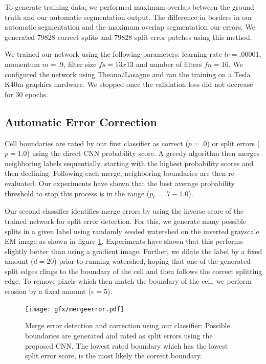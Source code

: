 To generate training data, we performed maximum overlap between the ground truth and our automatic segmentation output. The difference in borders in our automatic segmentation and the maximum overlap segmentation  our errors. We generated 79828 correct splits and 79828 split error patches using this method.

We trained our network using the following parameters: learning rate $lr=.00001$, momentum $m=.9$, filter size $fs=13x13$ and number of filters $fn=16$. We configured the network using Theano/Lasagne and ran the training on a Tesla K40m graphics hardware. We stopped once the validation loss did not decrease for 30 epochs.

\subsection{Automatic Error Correction}
Cell boundaries are rated by our first classifier as correct ($p=.0$) or split errors ($p=1.0$) using the direct CNN probability score. A greedy algorithm then merges neighboring labels sequentially, starting with the highest probability scores and then declining. Following each merge, neighboring boundaries are then re-evaluated. Our experiments have shown that the best average probability threshold to stop this process is in the range ($p_t=.7-1.0$).

Our second classifier identifies merge errors by using the inverse score of the trained network for split error detection. For this, we generate many possible splits in a given label using randomly seeded watershed on the inverted grayscale EM image as shown in figure \ref{fig:merge_error}. Experiments have shown that this performs slightly better than using a gradient image. Further, we dilate the label by a fixed amount ($d=20$) prior to running watershed, hoping that one of the generated split edges clings to the boundary of the cell and then follows the correct splitting edge. To remove pixels which then match the boundary of the cell, we perform erosion by a fixed amount ($e=5$).


\begin{figure}[t]
\centering
\texttt{[image: gfx/mergeerror.pdf]}
\caption{Merge error detection and correction using our classifier: Possible boundaries are generated and rated as split errors using the proposed CNN. The lowest rated boundary which has the lowest split error score, is the most likely the correct boundary.}
\label{fig:merge_error}
\end{figure}
%
